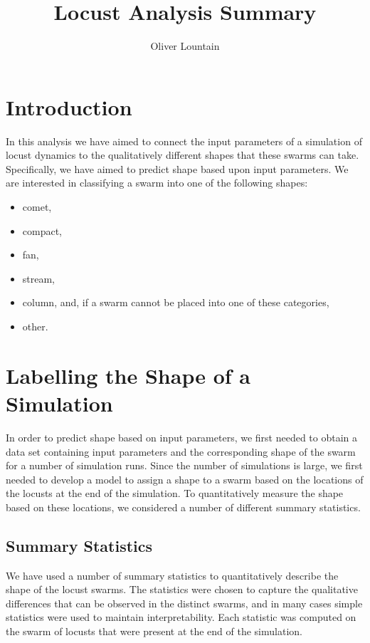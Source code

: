 \documentclass[a4paper]{article}
\begin{document}
\title{Locust Analysis Summary}
\author{Oliver Lountain}

\maketitle




\section{Introduction}

In this analysis we have aimed to connect the input parameters of a simulation of locust dynamics to the qualitatively different shapes that these swarms can take. Specifically, we have aimed to predict shape based upon input parameters. We are interested in classifying a swarm into one of the following shapes:
\begin{itemize}
    \item comet,
    \item compact,
    \item fan,
    \item stream,
    \item column, and, if a swarm cannot be placed into one of these categories,
    \item other.
\end{itemize}



\section{Labelling the Shape of a Simulation}

In order to predict shape based on input parameters, we first needed to obtain a data set containing input parameters and the corresponding shape of the swarm for a number of simulation runs. Since the number of simulations is large, we first needed to develop a model to assign a shape to a swarm based on the locations of the locusts at the end of the simulation. To quantitatively measure the shape based on these locations, we considered a number of different summary statistics.

\subsection{Summary Statistics}

We have used a number of summary statistics to quantitatively describe the shape of the locust swarms. The statistics were chosen to capture the qualitative differences that can be observed in the distinct swarms, and in many cases simple statistics were used to maintain interpretability. Each statistic was computed on the swarm of locusts that were present at the end of the simulation. 
\end{document}
